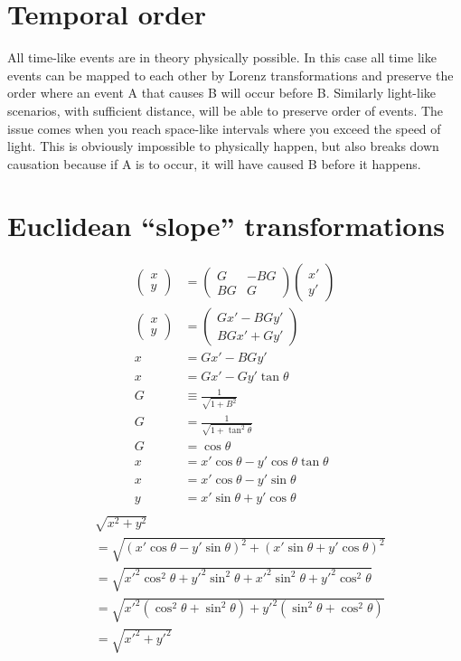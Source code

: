 \documentclass[11pt,letterpaper, twocolumn]{article}
\begin{document}
\section{Temporal order}
All time-like events are in theory physically possible. In this case all time like events can be mapped to each other by Lorenz transformations and preserve the order where an event A that causes B will occur before B. Similarly light-like scenarios, with sufficient distance, will be able to preserve order of events. The issue comes when you reach space-like intervals where you exceed the speed of light. This is obviously impossible to physically happen, but also breaks down causation because if A is to occur, it will have caused B before it happens. 

\section{Euclidean “slope” transformations}
\begin{align*}
    \begin{pmatrix}x\\y\end{pmatrix} &= \begin{pmatrix}G&-BG\\BG&G\end{pmatrix}\begin{pmatrix}x'\\y'\end{pmatrix}\\
    \begin{pmatrix}x\\y\end{pmatrix}&=\begin{pmatrix}Gx' - BGy' \\ BGx'+Gy'\end{pmatrix}\\
    x&=Gx' - BGy'\\
    x&=Gx' - Gy'\tan\theta\\
    G & \equiv \frac{1}{\sqrt{1+B^2}}\\
    G &= \frac{1}{\sqrt{1+\tan^2\theta}}\\
    G &= \cos\theta\\
    x&=x'\cos\theta - y'\cos\theta\tan\theta\\
    x&=x'\cos\theta - y'\sin\theta\\
    y&=x'\sin\theta+y'\cos\theta\\
\end{align*}
\begin{align*}
    &\sqrt{x^2+y^2}\\
    &=\sqrt{(x'\cos\theta - y'\sin\theta)^2+(x'\sin\theta+y'\cos\theta)^2}\\
    &=\sqrt{x'^2\cos^2\theta + y'^2\sin^2\theta +x'^2\sin^2\theta+y'^2\cos^2\theta}\\
    &=\sqrt{x'^2(\cos^2\theta + \sin^2\theta) + y'^2(\sin^2\theta +\cos^2\theta)}\\
    &=\sqrt{x'^2+ y'^2}\\
\end{align*}
\end{document}
